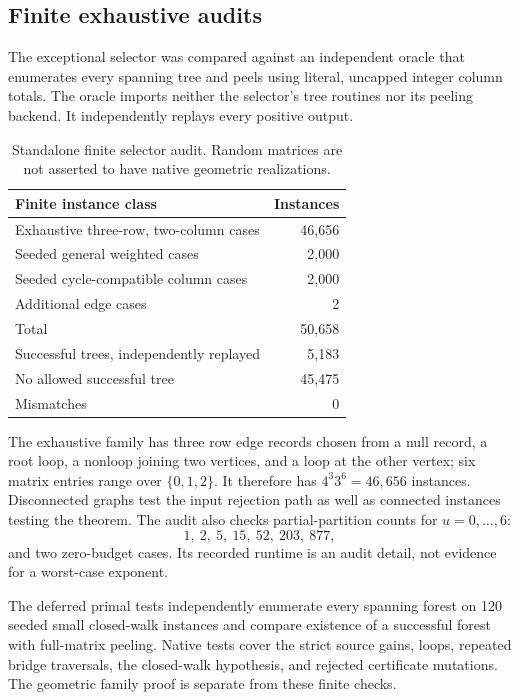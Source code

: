 \subsection{Finite exhaustive audits}

The exceptional selector was compared against an independent oracle that
enumerates every spanning tree and peels using literal, uncapped integer
column totals.  The oracle imports neither the selector's tree routines
nor its peeling backend.  It independently replays every positive output.

\begin{table}[htbp]
\centering
\begin{tabular}{lr}
\toprule
Finite instance class & Instances\\
\midrule
Exhaustive three-row, two-column cases & 46,656\\
Seeded general weighted cases & 2,000\\
Seeded cycle-compatible column cases & 2,000\\
Additional edge cases & 2\\
\midrule
Total & 50,658\\
Successful trees, independently replayed & 5,183\\
No allowed successful tree & 45,475\\
Mismatches & 0\\
\bottomrule
\end{tabular}
\caption{Standalone finite selector audit.  Random matrices are not
asserted to have native geometric realizations.}
\label{tab:finite-audit}
\end{table}

The exhaustive family has three row edge records chosen from a null
record, a root loop, a nonloop joining two vertices, and a loop at the
other vertex; six matrix entries range over $\{0,1,2\}$.  It therefore has
$4^3 3^6=46{,}656$ instances.  Disconnected graphs test the input rejection
path as well as connected instances testing the theorem.  The audit also
checks partial-partition counts for $u=0,\ldots,6$:
\[
 1,\ 2,\ 5,\ 15,\ 52,\ 203,\ 877,
\]
and two zero-budget cases.  Its recorded runtime is an audit detail, not
evidence for a worst-case exponent.

The deferred primal tests independently enumerate every spanning forest
on 120 seeded small closed-walk instances and compare existence of a
successful forest with full-matrix peeling.  Native tests cover the
strict source gains, loops, repeated bridge traversals, the closed-walk
hypothesis, and rejected certificate mutations.  The geometric family
proof is separate from these finite checks.

